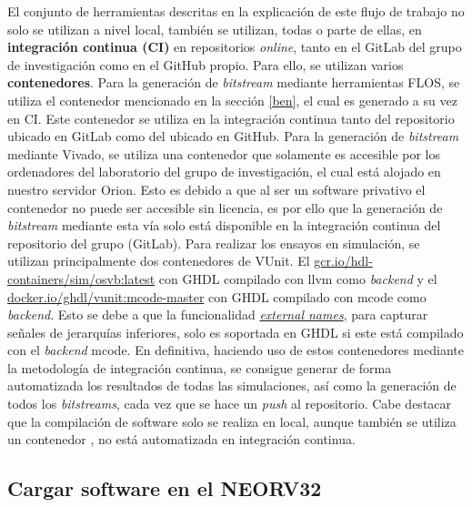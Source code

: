 El conjunto de herramientas descritas en la explicación de este flujo de trabajo no solo se utilizan a nivel local, también se utilizan, todas o parte de ellas, en \textbf{integración continua (CI)} en repositorios \textit{online}, tanto en el GitLab del grupo de investigación como en el GitHub propio.
Para ello, se utilizan varios \textbf{contenedores}.
Para la generación de \textit{bitstream} mediante herramientas FLOS, se utiliza el contenedor mencionado en la sección \ref{ben}, el cual es generado a su vez en CI.
Este contenedor se utiliza en la integración continua tanto del repositorio ubicado en GitLab como del ubicado en GitHub.
Para la generación de \textit{bitstream} mediante Vivado, se utiliza una contenedor que solamente es accesible por los ordenadores del laboratorio del grupo de investigación, el cual está alojado en nuestro servidor Orion.
Esto es debido a que al ser un software privativo el contenedor no puede ser accesible sin licencia, es por ello que la generación de \textit{bitstream} mediante esta vía solo está disponible en la integración continua del repositorio del grupo (GitLab).
Para realizar los ensayos en simulación, se utilizan principalmente dos contenedores de VUnit.
El \href{https://console.cloud.google.com/gcr/images/hdl-containers/global/sim/osvb}{gcr.io/hdl-containers/sim/osvb:latest} con GHDL compilado con llvm como \textit{backend} y el \href{https://hub.docker.com/layers/ghdl/vunit/mcode-master/images/sha256-e32029c5be70a5fa0fc94bffd15d72fa8b84ad8aaf2dc7cfa8ab8324ef733ed0?context=explore}{docker.io/ghdl/vunit:mcode-master} con GHDL compilado con mcode como \textit{backend}.
Esto se debe a que la funcionalidad \href{https://github.com/stnolting/neorv32/discussions/886}{\textit{external names}}, para capturar señales de jerarquías inferiores, solo es soportada en GHDL si este está compilado con el \textit{backend} mcode.
En definitiva, haciendo uso de estos contenedores mediante la metodología de integración continua, se consigue generar de forma automatizada los resultados de todas las simulaciones, así como la generación de todos los \textit{bitstreams}, cada vez que se hace un \textit{push} al repositorio.
Cabe destacar que la compilación de software solo se realiza en local, aunque también se utiliza un contenedor \cite{gh:sim-conatiner}, no está automatizada en integración continua.

\subsection{Cargar software en el NEORV32}

